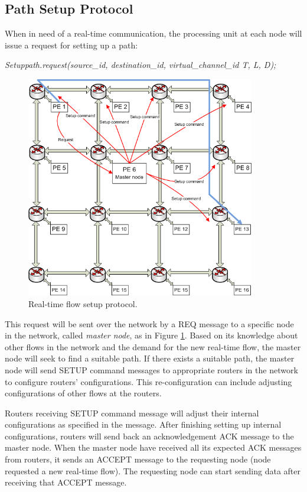 \documentclass[a4]{article}
\begin{document}
\subsection{Path Setup Protocol}
When in need of a real-time communication, the processing unit at each node 
will issue a request for setting up a path:

{\em Setuppath.request(source\_id, destination\_id, virtual\_channel\_id T, L,
D);}

\begin{figure}[htp]
\centering
\includegraphics[width=10cm]{pics/Protocol2}
\caption[Setup request for a real-time flow.]
{Real-time flow setup protocol.}\label{fig:ReqSetup}
\end{figure}

This request will be sent over the network by a REQ message to a specific node
in the network, called {\em master node}, as in Figure \ref{fig:ReqSetup}.
Based on its knowledge about other flows in the network and the demand for the
new real-time flow, the master node will seek to find a suitable path. If there
exists a suitable path, the master node will send SETUP command messages to
appropriate routers in the network to configure routers' configurations. This
re-configuration can include adjusting configurations of other flows at the routers.

Routers receiving SETUP command message will adjust their internal
configurations as specified in the message. After finishing setting up internal
configurations, routers will send back an acknowledgement ACK message to
the master node. When the master node have received all its expected ACK
messages from routers, it sends an ACCEPT message to the requesting node
(node requested a new real-time flow). The requesting node can start sending
data after receiving that ACCEPT message.
\end{document}
